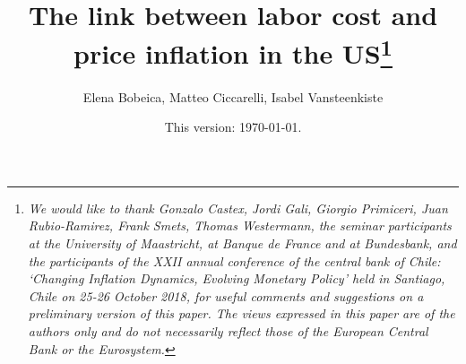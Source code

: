\documentclass[11pt]{article}
\begin{document}
\author[1]{Elena Bobeica, Matteo Ciccarelli, Isabel Vansteenkiste}
\title{The link between labor cost and price inflation in the US\thanks{
\vspace{-1ex} \textit{We would like to thank Gonzalo Castex, Jordi Gali, Giorgio Primiceri, Juan Rubio-Ramirez, Frank Smets, Thomas Westermann, the seminar participants at the University of Maastricht, at Banque de France and at Bundesbank, and the participants of the XXII annual conference of the central bank of Chile: `Changing Inflation Dynamics, Evolving Monetary Policy' held in Santiago, Chile on 25-26 October 2018, for useful comments and suggestions on a preliminary version of this paper. The views expressed in this paper are of the authors only and do not necessarily reflect those of the European Central Bank or the Eurosystem.}}}

\date{This version: \today. 
}
\maketitle


\maketitle
\end{document}
